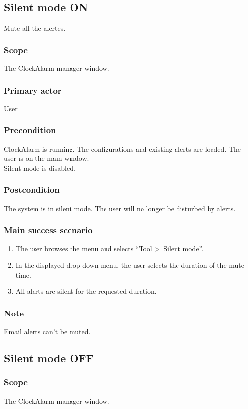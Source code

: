 \subsection{Silent mode ON}\label{subsec:usecase_silent_on}
Mute all the alertes.
\subsubsection{Scope}
The ClockAlarm manager window.
\subsubsection{Primary actor}
User
\subsubsection{Precondition}
ClockAlarm is running. The configurations and existing alerts are loaded. The user is on the main window.
\\Silent mode is disabled.
\subsubsection{Postcondition}
The system is in silent mode. The user will no longer be disturbed by alerts.
\subsubsection{Main success scenario}
\begin{enumerate}
	\item The user browses the menu and selects ``Tool \textgreater~Silent mode''.
	\item In the displayed drop-down menu, the user selects the duration of the mute time.
	\item All alerts are silent for the requested duration.
\end{enumerate}
\subsubsection{Note}
Email alerts can't be muted.

\subsection{Silent mode OFF}\label{subsec:usecase_silent_off}

\subsubsection{Scope}
The ClockAlarm manager window.
